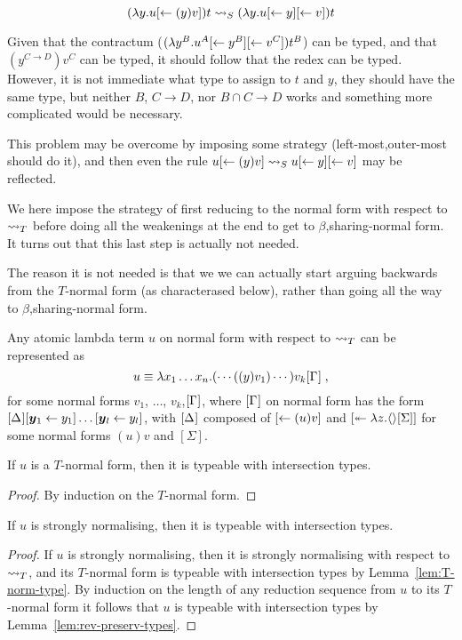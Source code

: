 \documentclass[orivec]{llncs}
\begin{document}
\[(\lambda y. u\share*{}{(y)v})t\ALnotbeta(\lambda y. u\share*{}{y}\share*{}{v})t\]

Given that the contractum ($(\lambda y^B. u^A\share*{}{y^B}\share*{}{v^C})t^B$) can be typed, and that $(y^{C\rightarrow D})v^C$ can be typed, it should follow that the redex can be typed. However, it is not immediate what type to assign to $t$ and $y$, they should have the same type, but neither $B$, $C\rightarrow D$, nor $B\cap C\rightarrow D$ works and something more complicated would be necessary.

This problem may be overcome by imposing some strategy (left-most,outer-most should do it), and then even the rule $u\share*{}{(y)v}\ALnotbeta u\share*{}{y}\share*{}{v}$ may be reflected.

We here impose the strategy of first reducing to the normal form with respect to $\ALtype$ before doing all the weakenings at the end to get to $\beta$,sharing-normal form. It turns out that this last step is actually not needed.

The reason it is not needed is that we we can actually start arguing backwards from the $T$-normal form (as characterased below), rather than going all the way to $\beta$,sharing-normal form.

\begin{ALlemma}\label{lem:type-normal-form}
Any atomic lambda term $u$ on normal form with respect to $\ALtype$ can be represented as
\[
 u \equiv \lambda x_1\dots x_n.(\cdots((y) v_1)\cdots )v_k\G\;,
\]
for some normal forms $v_1$, $\dots$, $v_k$,$\G$, where $\G$ on normal form has the form $\G*\share* {\vec y_1}{y_1}\dots\share* {\vec y_l}{y_l}$, with $\G*$ composed of $\share* {}{(u)v}$ and $\distr*{}z{\tup*{}[\Sigma]}$ for some normal forms $(u)v$ and $[\Sigma]$.
\end{ALlemma}

\begin{ALlemma}\label{lem:T-norm-type}
If $u$ is a $T$-normal form, then it is typeable with intersection types.
\end{ALlemma}

\begin{proof}
By induction on the $T$-normal form.
\end{proof}

\begin{ALtheorem}
If $u$ is strongly normalising, then it is typeable with intersection types.
\end{ALtheorem}

\begin{proof}
If $u$ is strongly normalising, then it is strongly normalising with respect to $\ALtype$, and its $T$-normal form is typeable with intersection types by Lemma~\ref{lem:T-norm-type}. By induction on the length of any reduction sequence from $u$ to its $T$-normal form it follows that $u$ is typeable with intersection types by Lemma~\ref{lem:rev-preserv-types}.
\end{proof}
\end{document}
